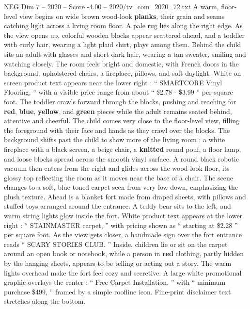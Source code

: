 \begin{textsample}{NEG Dim 7 – 2020 – Score -4.00 – 2020/tv\_com\_2020\_72.txt}  \label{ex:f7_neg_014}
A warm, floor-level view begins on wide brown wood-look \textbf{planks}, their grain and seams catching light across a living room floor.
A pale rug lies along the right edge.
As the view opens up, colorful wooden blocks appear scattered ahead, and a toddler with curly hair, wearing a light plaid shirt, plays among them.
Behind the child sits an adult with glasses and short dark hair, wearing a tan sweater, smiling and watching closely.
The room feels bright and domestic, with French doors in the background, upholstered chairs, a fireplace, pillows, and soft daylight.
White on-screen product text appears near the lower right : “ SMARTCORE Vinyl Flooring, ” with a visible price range from about “ \$2.78 - \$3.99 ” per square foot.
The toddler crawls forward through the blocks, pushing and reaching for \textbf{red}, \textbf{blue}, \textbf{yellow}, and \textbf{green} pieces while the adult remains seated behind, attentive and cheerful.
The child comes very close to the floor-level view, filling the foreground with their face and hands as they crawl over the blocks.
The background shifts past the child to show more of the living room : a white fireplace with a black screen, a beige chair, a \textbf{knitted} round pouf, a floor lamp, and loose blocks spread across the smooth vinyl surface.
A round black robotic vacuum then enters from the right and glides across the wood-look floor, its glossy top reflecting the room as it moves near the base of a chair.
The scene changes to a soft, blue-toned carpet seen from very low down, emphasizing the plush texture.
Ahead is a blanket fort made from draped sheets, with pillows and stuffed toys arranged around the entrance.
A teddy bear sits to the left, and warm string lights glow inside the fort.
White product text appears at the lower right : “ STAINMASTER carpet, ” with pricing shown as “ starting at \$2.28 ” per square foot.
As the view gets closer, a handmade sign over the fort entrance reads “ SCARY STORIES CLUB. ” Inside, children lie or sit on the carpet around an open book or notebook, while a person in \textbf{red} clothing, partly hidden by the hanging sheets, appears to be telling or acting out a story.
The warm lights overhead make the fort feel cozy and secretive.
A large white promotional graphic overlays the center : “ Free Carpet Installation, ” with “ minimum purchase \$499, ” framed by a simple roofline icon.
Fine-print disclaimer text stretches along the bottom.

\end{textsample}
